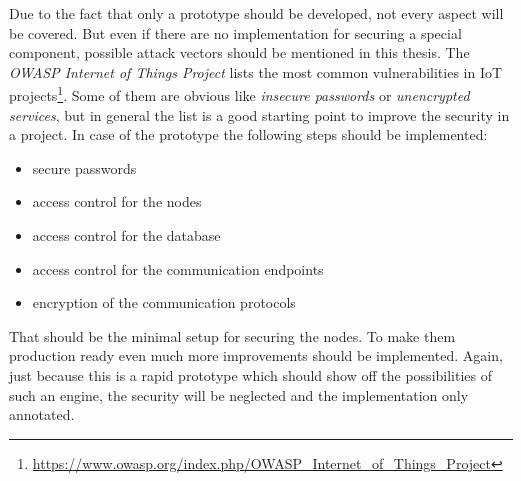 Due to the fact that only a prototype should be developed, not every aspect will be covered.
But even if there are no implementation for securing a special component, possible attack vectors should be mentioned in this thesis.
The \textit{OWASP Internet of Things Project} lists the most common vulnerabilities in \ac{IoT} projects\footnote{\url{https://www.owasp.org/index.php/OWASP_Internet_of_Things_Project}}.
Some of them are obvious like \textit{insecure passwords} or \textit{unencrypted services}, but in general the list is a good starting point to improve the security in a project.
In case of the prototype the following steps should be implemented:
\begin{itemize}
  \item secure passwords
  \item access control for the nodes
  \item access control for the database
  \item access control for the communication endpoints
  \item encryption of the communication protocols
\end{itemize}

That should be the minimal setup for securing the nodes.
To make them production ready even much more improvements should be implemented.
Again, just because this is a rapid prototype which should show off the possibilities of such an engine, the security will be neglected and the implementation only annotated.
